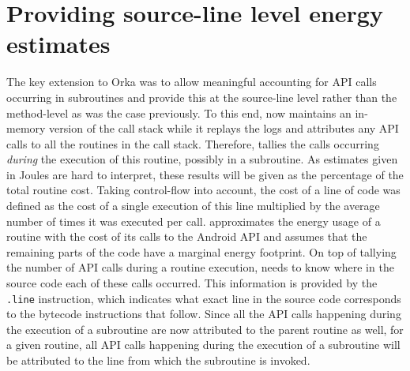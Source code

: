 \section{Providing source-line level energy estimates} 
\label{sec:sourceline}

The key extension to Orka was to allow meaningful accounting for API 
calls occurring in subroutines and provide this at the source-line level 
rather than the method-level as was the case previously. To this end, 
\orka{} now maintains an in-memory version of the call stack while it 
replays the logs and attributes any API calls to all the routines in the 
call stack. Therefore, \Orka{} tallies the calls occurring 
\textit{during} the execution of this routine, possibly in a subroutine. 
As estimates given in Joules are hard to interpret, these results will 
be given as the percentage of the total routine cost. Taking 
control-flow into account, the cost of a line of code was defined as the 
cost of a single execution of this line multiplied by the average number 
of times it was executed per call. \Orka{} approximates the energy usage 
of a routine with the cost of its calls to the Android API and assumes 
that the remaining parts of the code have a marginal energy footprint. 
On top of tallying the number of API calls during a routine execution, 
\Orka{} needs to know where in the source code each of these calls 
occurred. This information is provided by the \smali{} \texttt{.line} 
instruction, which indicates what exact line in the source code 
corresponds to the bytecode instructions that follow. Since all the API 
calls happening during the execution of a subroutine are now attributed 
to the parent routine as well, for a given routine, all API calls 
happening during the execution of a subroutine will be attributed to the 
line from which the subroutine is invoked.


